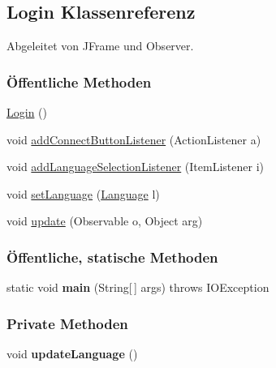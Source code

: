 \hypertarget{a00017}{\subsection{Login Klassenreferenz}
\label{a00017}
}


Abgeleitet von J\-Frame und Observer.

\subsubsection*{Öffentliche Methoden}
\begin{DoxyCompactItemize}
\item 
\hypertarget{a00017_a8db48c2902872da0ee80463db6696375}{\hyperlink{a00017_a8db48c2902872da0ee80463db6696375}{Login} ()}\label{a00017_a8db48c2902872da0ee80463db6696375}

\item 
void \hyperlink{a00017_aedb261b64a503ffc0e90c47a8ee9f266}{add\-Connect\-Button\-Listener} (Action\-Listener a)
\item 
void \hyperlink{a00017_ab8dff035c0ac307f7889ad8b3fba20bb}{add\-Language\-Selection\-Listener} (Item\-Listener i)
\item 
void \hyperlink{a00017_a9329ba7453dd661d50d2fb8024df3b2b}{set\-Language} (\hyperlink{a00015}{Language} l)
\item 
void \hyperlink{a00017_a2b67d42550fdf9ddd8f3878d0849965c}{update} (Observable o, Object arg)
\end{DoxyCompactItemize}
\subsubsection*{Öffentliche, statische Methoden}
\begin{DoxyCompactItemize}
\item 
\hypertarget{a00017_a8b260eecbaabcef8473fd87ada040682}{static void {\bfseries main} (String\mbox{[}$\,$\mbox{]} args)  throws I\-O\-Exception}\label{a00017_a8b260eecbaabcef8473fd87ada040682}

\end{DoxyCompactItemize}
\subsubsection*{Private Methoden}
\begin{DoxyCompactItemize}
\item 
\hypertarget{a00017_a74cba330cee84fa07487e12fdafe29aa}{void {\bfseries update\-Language} ()}\label{a00017_a74cba330cee84fa07487e12fdafe29aa}

\end{DoxyCompactItemize}
